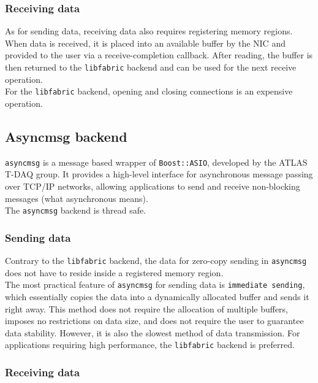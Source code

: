 \subsubsection{Receiving data}

As for sending data, receiving data also requires registering memory regions. When data is received, it is placed into an available buffer by the \acl{NIC} and provided to the user via a receive-completion callback. After reading, the buffer is then returned to the \texttt{libfabric} backend and can be used for the next receive operation.\\
For the \texttt{libfabric} backend, opening and closing connections is an expensive operation.

\subsection{Asyncmsg backend}
\label{subsec:asyncmsg}

\texttt{asyncmsg} is a message based wrapper of \texttt{Boost::ASIO}, developed by the \acs{ATLAS} \acs{T-DAQ} group. It provides a high-level interface for asynchronous message passing over TCP/IP networks, allowing applications to send and receive non-blocking messages (what asynchronous means).\\
The \texttt{asyncmsg} backend is thread safe.

\subsubsection{Sending data}

Contrary to the \texttt{libfabric} backend, the data for zero-copy sending in \texttt{asyncmsg} does not have to reside inside a registered memory region.\\
The most practical feature of \texttt{asyncmsg} for sending data is \texttt{immediate sending}, which essentially copies the data into a dynamically allocated buffer and sends it right away. This method does not require the allocation of multiple buffers, imposes no restrictions on data size, and does not require the user to guarantee data stability. However, it is also the slowest method of data transmission. For applications requiring high performance, the \texttt{libfabric} backend is preferred.

\subsubsection{Receiving data}


